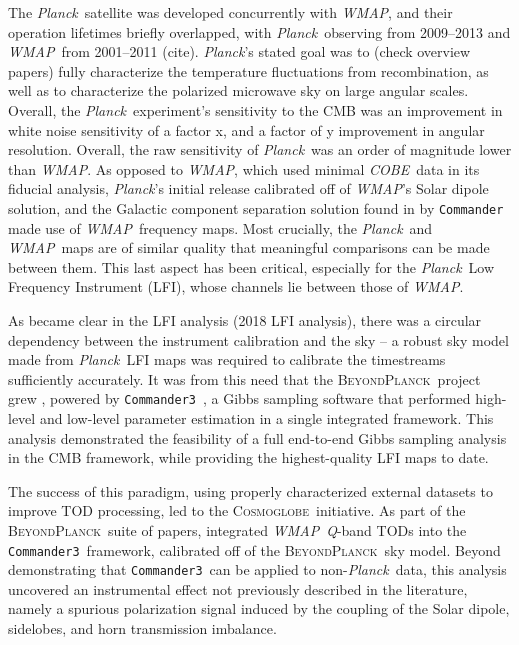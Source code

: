\documentclass[twocolumn]{../../common/aa}
\def\WMAP{\emph{WMAP}}
\def\COBE{\emph{COBE}}
\def\Planck{\emph{Planck}}
\def\commander{\texttt{Commander}}
\def\commanderthree{\texttt{Commander3}}
\newcommand{\BP}{\textsc{BeyondPlanck}}
\newcommand{\cosmoglobe}{\textsc{Cosmoglobe}}
\newcommand{\Q}[0]{\textit Q}
\begin{document}
The \Planck\ satellite was developed concurrently with \WMAP, and their operation lifetimes briefly overlapped, with \Planck\ observing from 2009--2013 and \WMAP\ from 2001--2011 (cite). \Planck's stated goal was to (check overview papers) fully characterize the temperature fluctuations from recombination, as well as to characterize the polarized microwave sky on large angular scales.  Overall, the \Planck\ experiment's sensitivity to the CMB was an improvement in white noise sensitivity of a factor x, and a factor of y improvement in angular resolution. Overall, the raw sensitivity of \Planck\ was an order of magnitude lower than \WMAP. As opposed to \WMAP, which used minimal \COBE\ data in its fiducial analysis, \Planck's initial release calibrated off of \WMAP's Solar dipole solution, and the Galactic component separation solution found in  \citet{planck2014-a12} by \commander\ \citep{jewell2004,eriksen:2004,eriksen2006,eriksen2008} made use of \WMAP\ frequency maps. Most crucially, the \Planck\ and \WMAP\ maps are of similar quality that meaningful comparisons can be made between them. This last aspect has been critical, especially for the \Planck\ Low Frequency Instrument (LFI), whose channels lie between those of \WMAP.


As became clear in the LFI analysis (2018 LFI analysis), there was a circular dependency between the instrument calibration and the sky -- a robust sky model made from \Planck\ LFI maps was required to calibrate the timestreams sufficiently accurately. It was from this need that the \BP\ project grew \citep{bp01}, powered by \commanderthree\ \citep{bp03}, a Gibbs sampling software that performed high-level and low-level parameter estimation in a single integrated framework. This analysis demonstrated the feasibility of a full end-to-end Gibbs sampling analysis in the CMB framework, while providing the highest-quality LFI maps to date.

The success of this paradigm, using properly characterized external datasets to improve TOD processing, led to the \cosmoglobe\ initiative. As part of the \BP\ suite of papers, \citet{bp17} integrated \WMAP\ \Q-band TODs into the \commanderthree\ framework, calibrated off of the \BP\ sky model. Beyond demonstrating that \commanderthree\ can be applied to non-\Planck\ data, this analysis uncovered an instrumental effect not previously described in the literature, namely a spurious polarization signal induced by the coupling of the Solar dipole, sidelobes, and horn transmission imbalance. 
\end{document}
